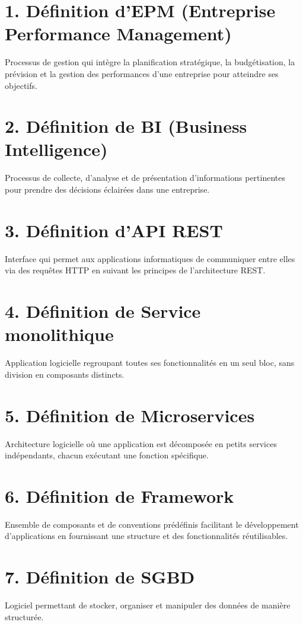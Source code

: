 \documentclass[a4paper, 11pt]{report}
\begin{document}
\section*{1. Définition d'EPM (Entreprise Performance Management)}
Processus de gestion qui intègre la planification stratégique, la budgétisation, la prévision et la gestion des performances d'une entreprise pour atteindre ses objectifs.

\section*{2. Définition de BI (Business Intelligence)}
Processus de collecte, d'analyse et de présentation d'informations pertinentes pour prendre des décisions éclairées dans une entreprise.

\section*{3. Définition d'API REST}
Interface qui permet aux applications informatiques de communiquer entre elles via des requêtes HTTP en suivant les principes de l'architecture REST.

\section*{4. Définition de Service monolithique}
Application logicielle regroupant toutes ses fonctionnalités en un seul bloc, sans division en composants distincts.

\section*{5. Définition de Microservices}
Architecture logicielle où une application est décomposée en petits services indépendants, chacun exécutant une fonction spécifique.

\section*{6. Définition de Framework}
Ensemble de composants et de conventions prédéfinis facilitant le développement d'applications en fournissant une structure et des fonctionnalités réutilisables.

\section*{7. Définition de SGBD}
Logiciel permettant de stocker, organiser et manipuler des données de manière structurée.
\end{document}
